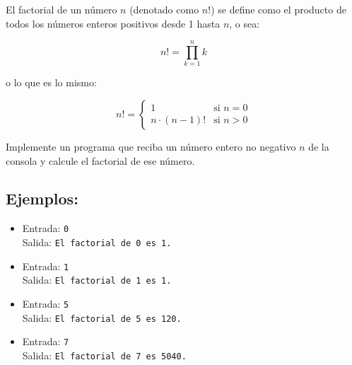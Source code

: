 El factorial de un número $n$ (denotado como $n!$) se define como el producto de todos los números enteros positivos desde 1 hasta $n$, o sea:

\[
n! = \prod_{k=1}^{n} k
\]

o lo que es lo mismo:

\[
n! =
\begin{cases} 
1 & \text{si } n = 0 \\
n \cdot (n-1)! & \text{si } n > 0
\end{cases}
\]

Implemente un programa que reciba un número entero no negativo \(n\) de la consola y calcule el factorial de ese número.

\subsection*{Ejemplos:}
\begin{itemize}
    \item Entrada: \texttt{0}\\
          Salida: \texttt{El factorial de 0 es 1.}
    \item Entrada: \texttt{1}\\
          Salida: \texttt{El factorial de 1 es 1.}
    \item Entrada: \texttt{5}\\
          Salida: \texttt{El factorial de 5 es 120.}
    \item Entrada: \texttt{7}\\
          Salida: \texttt{El factorial de 7 es 5040.}
\end{itemize}
